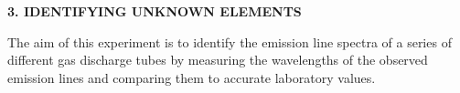 \documentclass[12pt]{article}
\begin{document}






\newpage

{\bf 3. IDENTIFYING UNKNOWN ELEMENTS}

\noindent
The aim of this experiment is to identify the emission line spectra of a series of different gas discharge tubes by measuring the wavelengths of the observed emission lines and comparing them to accurate laboratory values.
\end{document}
